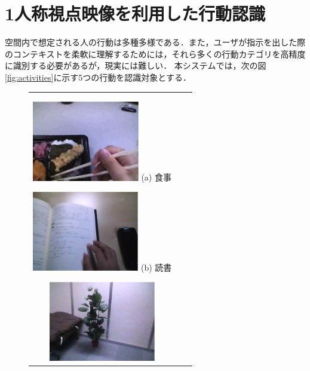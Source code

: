 \section{1人称視点映像を利用した行動認識}
空間内で想定される人の行動は多種多様である．また，ユーザが指示を出した際のコンテキストを柔軟に理解するためには，それら多くの行動カテゴリを高精度に識別する必要があるが，現実には難しい．
本システムでは，次の図{\ref{fig:activities}}に示す5つの行動を認識対象とする．
%
\begin{figure}[htbp]
\begin{tabular}{ccc}
%
  \begin{minipage}{0.33\textwidth}
    \begin{center}
      \includegraphics[height=35mm]{figure/fpv_eating.eps}
      \hspace{1.6cm} (a) 食事
      \vspace{3mm}
    \end{center}
  \end{minipage}
%
  \begin{minipage}{0.33\textwidth}
    \begin{center}
      \includegraphics[height=35mm]{figure/fpv_reading.eps}
      \hspace{1.6cm} (b) 読書
      \vspace{3mm}
    \end{center}
  \end{minipage}
%
  \begin{minipage}{0.33\textwidth}
    \begin{center}
      \includegraphics[height=35mm]{figure/fpv_tree.eps}

\end{center}
\end{minipage}
\end{tabular}
\end{figure}
